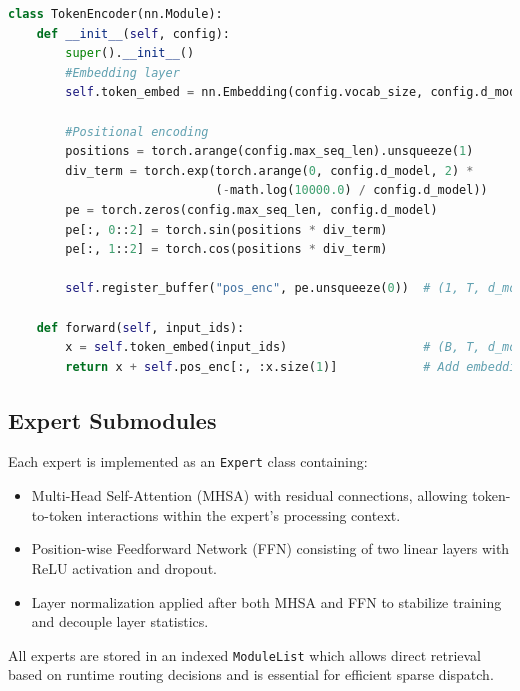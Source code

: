 \documentclass{article}
\begin{document}
\begin{lstlisting}[language=Python, caption={\texttt{TokenEncoder} module}, label={lst:input_enc}]
class TokenEncoder(nn.Module):
    def __init__(self, config):
        super().__init__()
        #Embedding layer
        self.token_embed = nn.Embedding(config.vocab_size, config.d_model)

        #Positional encoding 
        positions = torch.arange(config.max_seq_len).unsqueeze(1)
        div_term = torch.exp(torch.arange(0, config.d_model, 2) *
                             (-math.log(10000.0) / config.d_model))
        pe = torch.zeros(config.max_seq_len, config.d_model)
        pe[:, 0::2] = torch.sin(positions * div_term)
        pe[:, 1::2] = torch.cos(positions * div_term)

        self.register_buffer("pos_enc", pe.unsqueeze(0))  # (1, T, d_model)

    def forward(self, input_ids):
        x = self.token_embed(input_ids)                   # (B, T, d_model)
        return x + self.pos_enc[:, :x.size(1)]            # Add embedding + positional


\end{lstlisting}




\subsection{Expert Submodules}
Each expert is implemented as an \texttt{Expert} class containing:
\begin{itemize}
    \item Multi-Head Self-Attention (MHSA) with residual connections, allowing token-to-token interactions within the expert’s processing context.
    \item Position-wise Feedforward Network (FFN) consisting of two linear layers with ReLU activation and dropout.
    \item Layer normalization applied after both MHSA and FFN to stabilize training and decouple layer statistics.
\end{itemize}
All experts are stored in an indexed \texttt{ModuleList} which allows direct retrieval based on runtime routing decisions and is essential for efficient sparse dispatch.
\vspace{3pt}
\end{document}
